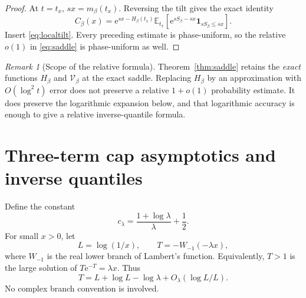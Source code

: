 \documentclass[11pt,a4paper]{article}
\theoremstyle{definition}
\theoremstyle{remark}\newtheorem{remark}[theorem]{Remark}
\newcommand{\EE}{\mathbb E}
\newcommand{\VV}{\mathcal V}
\newcommand{\e}{\mathrm e}
\newcommand{\ind}{\mathbf 1}
\begin{document}
\begin{proof}
At $t=t_x$, $sx=m_\beta(t_x)$.  Reversing the tilt gives the exact identity
\[
 C_\beta(x)=\e^{sx-H_\beta(t_x)}
       \EE_{t_x}[\e^{sS_\beta-sx}\ind_{sS_\beta\le sx}].
\]
Insert \eqref{eq:localtilt}.  Every preceding estimate is phase-uniform,
so the relative $o(1)$ in \eqref{eq:saddle} is phase-uniform as well.
\end{proof}

\begin{remark}[Scope of the relative formula]
Theorem~\ref{thm:saddle} retains the \emph{exact} functions $H_\beta$ and
$\VV_\beta$ at the exact saddle.  Replacing $H_\beta$ by an approximation
with $O(\log^2 t)$ error does not preserve a relative $1+o(1)$ probability
estimate.  It does preserve the logarithmic expansion below, and that
logarithmic accuracy is enough to give a relative inverse-quantile formula.
\end{remark}

\section{Three-term cap asymptotics and inverse quantiles}
\label{sec:quantile}

Define the constant
\begin{equation}
 c_\lambda=\frac{1+\log\lambda}{\lambda}+\frac12.
 \label{eq:clambda}
\end{equation}
For small $x>0$, let
\begin{equation}
 L=\log(1/x),\qquad T=-W_{-1}(-\lambda x),
 \label{eq:Lambert}
\end{equation}
where $W_{-1}$ is the real lower branch of Lambert's function.  Equivalently,
$T>1$ is the large solution of $T\e^{-T}=\lambda x$.  Thus
\begin{equation}
 T=L+\log L-\log\lambda+O_\lambda(\log L/L).
 \label{eq:Texp}
\end{equation}
No complex branch convention is involved.
\end{document}
